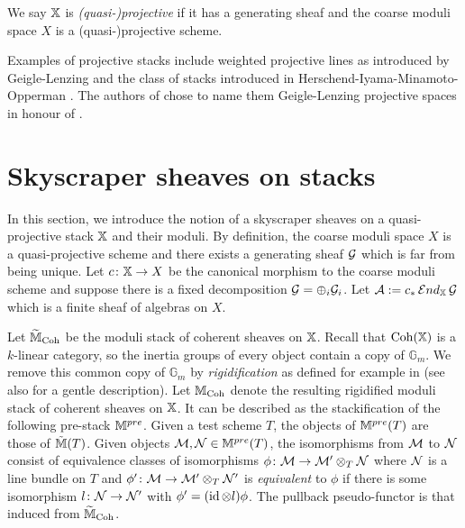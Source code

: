 \documentclass[12pt]{amsart}
\begin{document}
\begin{definition}
We say $\mathbb{X}$ is {\em (quasi-)projective} if it has a generating sheaf and the coarse moduli space $X$ is a (quasi-)projective scheme.
\end{definition}

Examples of projective stacks include weighted projective lines as introduced by Geigle-Lenzing \cite{GL} and the class of stacks introduced in Herschend-Iyama-Minamoto-Opperman \cite{HIMO}.
The authors of \cite{HIMO} chose to name them Geigle-Lenzing projective spaces in honour of \cite{GL}.

\section{Skyscraper sheaves on stacks}
\label{sec:sky}

In this section, we introduce the notion of a skyscraper sheaves on a quasi-projective stack $\mathbb{X}$ and their moduli. By definition, the coarse moduli space $X$ is a quasi-projective scheme and there exists a generating sheaf $\mathcal{G}$ which is far from being unique. Let $c \colon \mathbb{X} \rightarrow X$ be the canonical morphism to the coarse moduli scheme and suppose there is a fixed decomposition $\mathcal{G} = \oplus_i \mathcal{G}_i$. Let $\mathcal{A} := c_* \mathop{{\mathcal{E}}nd}\nolimits_{\mathbb{X}} \mathcal{G}$ which is a finite sheaf of algebras on $X$.

Let $\widetilde{\mathbb{M}}_{\operatorname{Coh}}$ be the moduli stack of coherent sheaves on $\mathbb{X}$. Recall that $\operatorname{Coh}(\mathbb{X})$ is a $k$-linear category, so the inertia groups of every object contain a copy of $\mathbb{G}_m$. We remove this common copy of $\mathbb{G}_m$ by {\em rigidification} as defined for example in \cite[Section~5]{ACV} (see also \cite[Section~2.3]{CL} for a gentle description). Let $\mathbb{M}_{\operatorname{Coh}}$ denote the resulting rigidified moduli stack of coherent sheaves on $\mathbb{X}$. It can be described as the stackification of the following pre-stack $\mathbb{M}^{pre}$. Given a test scheme $T$, the objects of $\mathbb{M}^{pre}(T)$ are those of $\tilde{\mathbb{M}}(T)$. Given objects $\mathcal{M}, \mathcal{N} \in \mathbb{M}^{pre}(T)$, the isomorphisms from $\mathcal{M}$ to $\mathcal{N}$ consist of equivalence classes of isomorphisms $\phi \colon \mathcal{M} \to \mathcal{M}' \otimes_T \mathcal{N}$ where $\mathcal{N}$ is a line bundle on $T$ and $\phi' \colon \mathcal{M} \to \mathcal{M}' \otimes_T \mathcal{N}'$ is {\em equivalent} to $\phi$ if there is some isomorphism $l \colon \mathcal{N} \to \mathcal{N}'$ with $\phi' = (\operatorname{id} \otimes l) \phi$. The pullback pseudo-functor is that induced from $\widetilde{\mathbb{M}}_{\operatorname{Coh}}$. 
\end{document}
